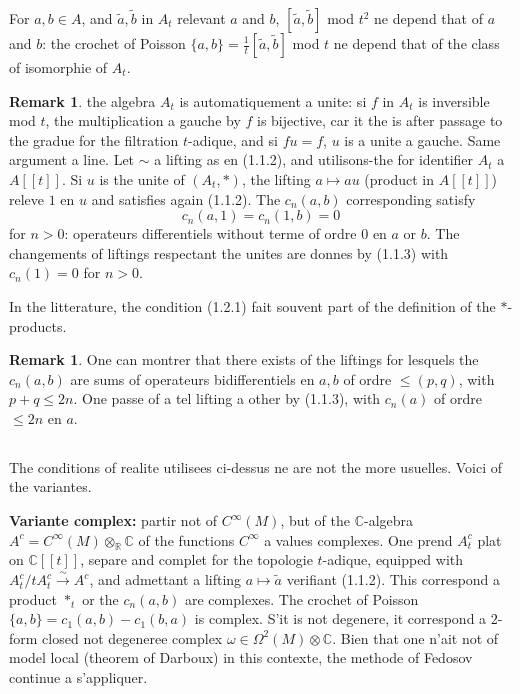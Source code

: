 \documentclass[11pt,a4paper]{article}
\theoremstyle{plain}
\theoremstyle{definition}
\newtheorem{remark}[theorem]{Remark}
\newcommand{\R}{\mathbb{R}}
\newcommand{\C}{\mathbb{C}}
\newcommand{\iso}{\xrightarrow{\sim}}
\begin{document}
For $a, b \in A$, and $\tilde{a}, \tilde{b}$ in $A_{t}$ relevant $a$ and $b$, $[\tilde{a}, \tilde{b}]$ mod $t^{2}$ ne depend that
of $a$ and $b$: the crochet of Poisson $\{a, b\} = \frac{1}{t}[\tilde{a}, \tilde{b}]$ mod $t$ ne depend that of the class
of isomorphie of $A_{t}$.

\begin{remark}
the algebra $A_{t}$ is automatiquement a unite: si $f$ in $A_{t}$ is inversible mod $t$, the multiplication a gauche by $f$ is bijective, car it the is after passage
to the gradue for the filtration $t$-adique, and si $fu = f$, $u$ is a unite a gauche. Same
argument a line. Let $\sim$ a lifting as en (1.1.2), and utilisons-the for
identifier $A_{t}$ a $A[[t]]$. Si $u$ is the unite of $(A_{t}, *)$, the lifting $a \mapsto au$ (product in
$A[[t]]$) releve $1$ en $u$ and satisfies again (1.1.2). The $c_{n}(a, b)$ corresponding satisfy
\begin{equation}
c_{n}(a, 1) = c_{n}(1, b) = 0 \tag{1.2.1}
\end{equation}
for $n > 0$: operateurs differentiels without terme of ordre $0$ en $a$ or $b$. The changements
of liftings respectant the unites are donnes by (1.1.3) with $c_{n}(1) = 0$ for
$n > 0$.

In the litterature, the condition (1.2.1) fait souvent part of the definition of the
$*$-products.
\end{remark}

\begin{remark}
One can montrer that there exists of the liftings for lesquels the
$c_{n}(a, b)$ are sums of operateurs bidifferentiels en $a, b$ of ordre $\leq (p,q)$, with $p + q \leq 2n$. One passe of a tel lifting a other by (1.1.3), with $c_{n}(a)$ of ordre $\leq 2n$
en $a$.
\end{remark}

\subsection{}
The conditions of realite utilisees ci-dessus ne are not the more usuelles. Voici
of the variantes.

\textbf{Variante complex:} partir not of $C^{\infty}(M)$, but of the $\C$-algebra $A^{c} = C^{\infty}(M) \otimes_{\R} \C$
of the functions $C^{\infty}$ a values complexes. One prend $A_{t}^{c}$ plat on $\C[[t]]$, separe and
complet for the topologie $t$-adique, equipped with $A_{t}^{c}/tA_{t}^{c} \iso A^{c}$, and admettant a
lifting $a \mapsto \tilde{a}$ verifiant (1.1.2). This correspond a product $*_{t}$ or the $c_{n}(a, b)$
are complexes. The crochet of Poisson $\{a,b\} = c_{1}(a,b) - c_{1}(b,a)$ is complex.
S'it is not degenere, it correspond a $2$-form closed not degeneree complex
$\omega \in \Omega^{2}(M) \otimes \C$. Bien that one n'ait not of model local (theorem of Darboux) in
this contexte, the methode of Fedosov continue a s'appliquer.
\end{document}
